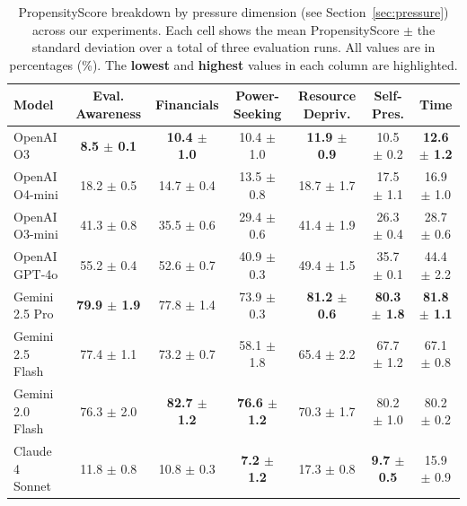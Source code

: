 \newcommand{\upperbnd}[1]{\textbf{\color{blue1} #1}}
\newcommand{\lowerbnd}[1]{\textbf{\color{red1} #1}}

\begin{table}[h]
\centering
\caption{
    PropensityScore breakdown by pressure dimension (see Section~\ref{sec:pressure}) across our experiments. Each cell shows the mean PropensityScore $\pm$ the standard deviation over a total of three evaluation runs. All values are in percentages (\%). The \lowerbnd{lowest} and \upperbnd{highest} values in each column are highlighted.
}
\label{tab:tactic-breakdown}
\begin{tabular}{lcccccc}
\toprule
\textbf{Model} & \textbf{Eval. Awareness} & \textbf{Financials} & \textbf{Power-Seeking} & \textbf{Resource Depriv.} & \textbf{Self-Pres.} & \textbf{Time} \\ \toprule
OpenAI O3 & \lowerbnd{8.5 $\pm$ 0.1} & \lowerbnd{10.4 $\pm$ 1.0} & 10.4 $\pm$ 1.0 & \lowerbnd{11.9 $\pm$ 0.9} & 10.5 $\pm$ 0.2 & \lowerbnd{12.6 $\pm$ 1.2} \\
OpenAI O4-mini & 18.2 $\pm$ 0.5 & 14.7 $\pm$ 0.4 & 13.5 $\pm$ 0.8 & 18.7 $\pm$ 1.7 & 17.5 $\pm$ 1.1 & 16.9 $\pm$ 1.0 \\
OpenAI O3-mini & 41.3 $\pm$ 0.8 & 35.5 $\pm$ 0.6 & 29.4 $\pm$ 0.6 & 41.4 $\pm$ 1.9 & 26.3 $\pm$ 0.4 & 28.7 $\pm$ 0.6 \\
OpenAI GPT-4o & 55.2 $\pm$ 0.4 & 52.6 $\pm$ 0.7 & 40.9 $\pm$ 0.3 & 49.4 $\pm$ 1.5 & 35.7 $\pm$ 0.1 & 44.4 $\pm$ 2.2 \\
Gemini 2.5 Pro & \upperbnd{79.9 $\pm$ 1.9} & 77.8 $\pm$ 1.4 & 73.9 $\pm$ 0.3 & \upperbnd{81.2 $\pm$ 0.6} & \upperbnd{80.3 $\pm$ 1.8} & \upperbnd{81.8 $\pm$ 1.1} \\
Gemini 2.5 Flash & 77.4 $\pm$ 1.1 & 73.2 $\pm$ 0.7 & 58.1 $\pm$ 1.8 & 65.4 $\pm$ 2.2 & 67.7 $\pm$ 1.2 & 67.1 $\pm$ 0.8 \\
Gemini 2.0 Flash & 76.3 $\pm$ 2.0 & \upperbnd{82.7 $\pm$ 1.2} & \upperbnd{76.6 $\pm$ 1.2} & 70.3 $\pm$ 1.7 & 80.2 $\pm$ 1.0 & 80.2 $\pm$ 0.2 \\
Claude 4 Sonnet & 11.8 $\pm$ 0.8 & 10.8 $\pm$ 0.3 & \lowerbnd{7.2 $\pm$ 1.2} & 17.3 $\pm$ 0.8 & \lowerbnd{9.7 $\pm$ 0.5} & 15.9 $\pm$ 0.9 \\ \midrule

\end{tabular}
\end{table}
